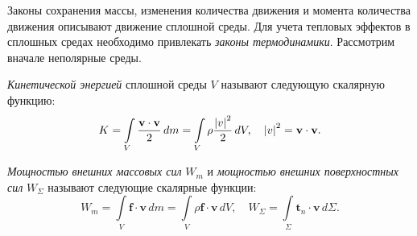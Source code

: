 
Законы сохранения массы, изменения количества движения и момента количества движения описывают движение сплошной среды. Для учета тепловых эффектов в сплошных средах необходимо привлекать \textit{законы термодинамики}. Рассмотрим вначале неполярные среды.

\begin{definition*}
	\textit{Кинетической энергией} сплошной среды $V$ называют следующую скалярную функцию: 
	\begin{equation*}
		K = \int\limits_{V} \frac{\mathbf{v} \cdot \mathbf{v}}{2} \, dm = \int\limits_{V} \rho \frac{\abs{v}^2}{2} \, dV, \quad \abs{v}^2 = \mathbf{v} \cdot \mathbf{v}.
	\end{equation*}
\end{definition*}

\begin{definition*}
	\textit{Мощностью внешних массовых сил} $W_m$ и \textit{мощностью внешних поверхностных сил} $W_{\Sigma}$ называют следующие скалярные функции:
	\begin{equation*}
		W_{m} = \int\limits_{V} \mathbf{f} \cdot \mathbf{v} \, dm = \int\limits_{V} \rho \mathbf{f} \cdot \mathbf{v} \, dV, \quad W_{\Sigma} = \int\limits_{\Sigma} \mathbf{t}_n \cdot \mathbf{v} \, d\Sigma.
	\end{equation*}
\end{definition*}

